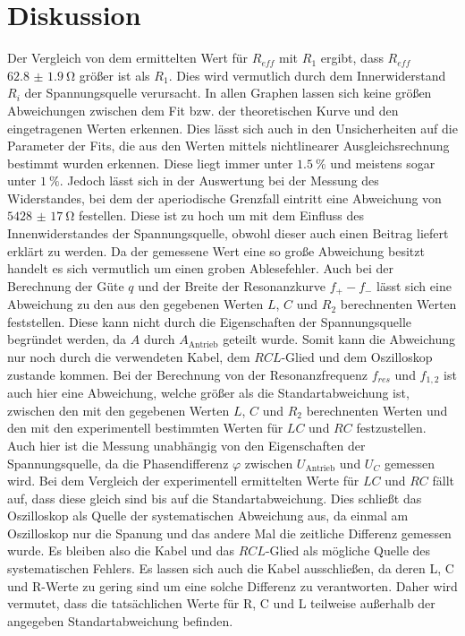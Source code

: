 \section{Diskussion}
\label{sec:Diskussion}
Der Vergleich von dem ermittelten Wert für $R_{eff}$ mit $R_1$ ergibt, dass $R_{eff}$ $\SI{62.8(19)}{\ohm}$ größer ist als $R_1$. Dies wird vermutlich durch dem Innerwiderstand $R_i$ der Spannungsquelle verursacht.
In allen Graphen lassen sich keine größen Abweichungen zwischen dem Fit bzw. der theoretischen Kurve und den eingetragenen Werten erkennen. Dies lässt sich auch in den Unsicherheiten auf die Parameter der Fits, die aus den Werten mittels nichtlinearer Ausgleichsrechnung bestimmt wurden erkennen. Diese liegt immer unter $\SI{1.5}{\percent}$ und meistens sogar unter $\SI{1}{\percent}$. Jedoch lässt sich in der Auswertung bei der Messung des Widerstandes, bei dem der aperiodische Grenzfall eintritt eine Abweichung von $\SI{5428(17)}{\ohm}$ festellen. Diese ist zu hoch um mit dem Einfluss des Innenwiderstandes der Spannungsquelle, obwohl dieser auch einen Beitrag liefert erklärt zu werden. Da der gemessene Wert eine so große Abweichung besitzt handelt es sich vermutlich um einen groben Ablesefehler. Auch bei der Berechnung der Güte $q$ und der Breite der Resonanzkurve $f_+ - f_-$ lässt sich eine Abweichung zu den aus den gegebenen Werten $L$, $C$ und $R_2$ berechnenten Werten feststellen. Diese kann nicht durch die Eigenschaften der Spannungsquelle begründet werden, da $A$ durch $A_{\text{Antrieb}}$ geteilt wurde. Somit kann die Abweichung nur noch durch die verwendeten Kabel, dem $RCL$-Glied und dem Oszilloskop zustande kommen. Bei der Berechnung von der Resonanzfrequenz $f_{res}$ und $f_{1,2}$ ist auch hier eine Abweichung, welche größer als die Standartabweichung ist, zwischen den mit den gegebenen Werten $L$, $C$ und $R_2$ berechnenten Werten und den mit den experimentell bestimmten Werten für $LC$ und $RC$ festzustellen. Auch hier ist die Messung unabhängig von den Eigenschaften der Spannungsquelle, da die Phasendifferenz $\varphi$ zwischen $U_{\text{Antrieb}}$ und $U_C$ gemessen wird. Bei dem Vergleich der experimentell ermittelten Werte für $LC$ und $RC$ fällt auf, dass diese gleich sind bis auf die Standartabweichung. Dies schließt das Oszilloskop als Quelle der systematischen Abweichung aus, da einmal am Oszilloskop nur die Spanung und das andere Mal die zeitliche Differenz gemessen wurde. Es bleiben also die Kabel und das $RCL$-Glied als mögliche Quelle des systematischen Fehlers. Es lassen sich auch die Kabel ausschließen, da deren L, C und R-Werte zu gering sind um eine solche Differenz zu verantworten. Daher wird vermutet, dass die tatsächlichen Werte für R, C und L teilweise außerhalb der angegeben Standartabweichung befinden.
